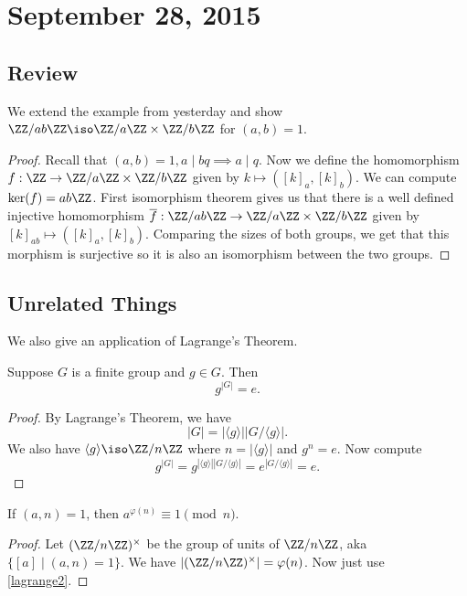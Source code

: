 \section{September 28, 2015}

\subsection{Review}

\begin{ex}
We extend the example from yesterday and show $\ZZ / ab \ZZ \iso \ZZ / a
\ZZ \times \ZZ / b \ZZ$ for $(a, b) = 1$.
\end{ex}

\begin{proof}
Recall that $(a, b) = 1, a \mid bq \implies a \mid q$. Now we define the
homomorphism $f : \ZZ \to \ZZ / a \ZZ \times \ZZ / b \ZZ$ given by $k
\mapsto ([k]_a, [k]_b)$. We can compute $\ker(f) = ab\ZZ$. First
isomorphism theorem gives us that there is a well defined injective
homomorphism $\overline{f} : \ZZ / ab \ZZ \to \ZZ / a \ZZ \times \ZZ / b
\ZZ$ given by $[k]_{ab} \mapsto ([k]_a, [k]_b)$. Comparing the sizes of
both groups, we get that this morphism is surjective so it is also an
isomorphism between the two groups.
\end{proof}

\subsection{Unrelated Things}

We also give an application of Lagrange's Theorem.

\begin{lem}
\label{lagrange2}
Suppose $G$ is a finite group and $g \in G$. Then
\[ g^{|G|} = e. \]
\end{lem}

\begin{proof}
By Lagrange's Theorem, we have
\[ |G| = |\langle g \rangle||G/\langle g \rangle|. \]
We also have $\langle g \rangle \iso \ZZ / n \ZZ$ where $n = |\langle g
\rangle|$ and $g^n = e$. Now compute
\[ g^{|G|} = g^{|\langle g \rangle||G / \langle g \rangle|} = e^{|G /
\langle g \rangle|} = e. \]
\end{proof}

\begin{thm}
If $(a, n) = 1$, then $a^{\varphi(n)} \equiv 1 \pmod{n}$.
\end{thm}

\begin{proof}
Let $(\ZZ / n \ZZ)^{\times}$ be the group of units of $\ZZ / n \ZZ$, aka
$\lbrace [a] \mid (a, n) = 1 \rbrace$. We have $|(\ZZ / n \ZZ)^\times| =
\varphi(n)$. Now just use \ref{lagrange2}.
\end{proof}

